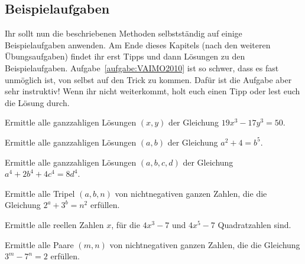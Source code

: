 \subsection*{Beispielaufgaben}
Ihr sollt nun die beschriebenen Methoden selbstständig auf einige Beispielaufgaben anwenden. Am Ende dieses Kapitels (nach den weiteren Übungsaufgaben) findet ihr erst Tipps und dann Lösungen zu den Beispielaufgaben. Aufgabe~\ref{aufgabe:VAIMO2010} ist so schwer, dass es fast unmöglich ist, von selbst auf den Trick zu kommen. Dafür ist die Aufgabe aber sehr instruktiv! Wenn ihr nicht weiterkommt, holt euch einen Tipp oder lest euch die Lösung durch.

\begin{aufgabe*}\label{aufgabe:521235}
	Ermittle alle ganzzahligen Lösungen $(x,y)$ der Gleichung $19x^3-17y^3=50$.
\end{aufgabe*}
\begin{aufgabe*}\label{aufgabe:Modulo11}
	Ermittle alle ganzzahligen Lösungen $(a,b)$ der Gleichung $a^2+4=b^5$.
\end{aufgabe*}
\begin{aufgabe*}\label{aufgabe:UnendlicherAbstieg}
	Ermittle alle ganzzahligen Lösungen $(a,b,c,d)$ der Gleichung $a^4+2b^4+4c^4=8d^4$.
\end{aufgabe*}
\begin{aufgabe*}\label{aufgabe:Modulo+Faktorisierung}
	Ermittle alle Tripel $(a,b,n)$ von nichtnegativen ganzen Zahlen, die die Gleichung $2^a+3^b=n^2$ erfüllen.
\end{aufgabe*}
\begin{aufgabe*}[*]\label{aufgabe:471046}
	Ermittle alle reellen Zahlen $x$, für die $4x^3-7$ und $4x^5-7$ Quadratzahlen sind.
\end{aufgabe*}
\begin{aufgabe*}[***]\label{aufgabe:VAIMO2010}
	Ermittle alle Paare $(m,n)$ von nichtnegativen ganzen Zahlen, die die Gleichung $3^m-7^n=2$ erfüllen.
\end{aufgabe*}

